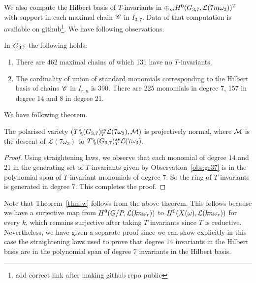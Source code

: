 We also compute the Hilbert basis of $T$-invariants in $\oplus_m H^0(G_{{3},{7}}, {\cal L}(7m\omega_3))^T$ with support in each maximal chain $\mathscr{C}$ in $I_{3,7}$.
Data of that computation is available on github\footnote{add correct link after making github repo public}. We have following observations. 
\begin{observation}
\label{obs:gr37}
In $G_{{3},{7}}$ the following holds:
\begin{enumerate}
\item There are 462 maximal chains of which 131 have no $T$-invariants.
\item The cardinality of union of standard monomials corresponding to the Hilbert basis of chains $\mathscr{C}$ in $I_{r,n}$ is 390. There are 225 monomials in degree 7, 157 in degree 14 and 8 in degree 21.
\end{enumerate}
\end{observation}
  We have following theorem. 
\begin{theorem}
    The polarised variety \((T \backslash\mkern-6mu\backslash (G_{{3},{7}})^{ss}_T{\cal L}(7\omega_3),{\cal M})\) is projectively normal, where \(\cal M\) is the descent of \({\mathcal L}(7\omega_3)\) to \(T \backslash\mkern-6mu\backslash (G_{{3},{7}})^{ss}_T{\cal L}(7\omega_3)\).
\end{theorem}
\begin{proof}
Using straightening laws, we observe that each monomial of degree \(14\) and \(21\) in the generating set of $T$-invariants given by Observation~\ref{obs:gr37} is in the polynomial span of  $T$-invariant monomials  of degree \(7\). So the ring of $T$ invariants is generated in degree $7$. This completes the proof.
\end{proof}

Note that Theorem~\ref{thm:w} follows from the above theorem. This follows because we have a surjective map from $H^0(G/P, {\cal L}(kn\omega_r))$ to 
$H^0(X(\omega), {\cal L}(kn\omega_r))$ for every $k$, which remains surjective after taking $T$ invariants since $T$ is reductive. Nevertheless, we have given a separate proof since 
we can show explicitly in this case the straightening laws used to prove that degree 14 invariants in the Hilbert basis are in the polynomial span of degree 7 invariants in the Hilbert basis.
 
